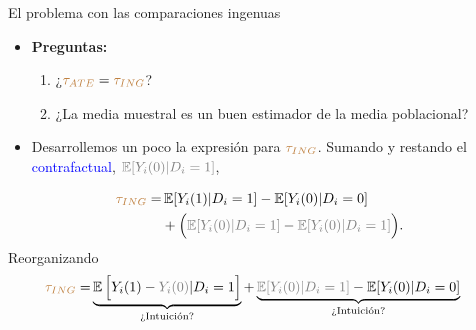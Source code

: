 \documentclass[10pt, xcolor=dvipsnames]{beamer}
\begin{document}
\begin{frame}{El problema con las comparaciones ingenuas}
\begin{itemize}	
    \item \textbf{Preguntas:} 
    \begin{enumerate}
        \item ¿$\textcolor{brown}{\tau_{ATE}}=\textcolor{brown}{\tau_{ING}}$?
        \item ¿La media muestral es un buen estimador de la media poblacional?%
    \end{enumerate}
    \vspace{1em}
    \item Desarrollemos un poco la expresión para $\textcolor{brown}{\tau_{ING}}$. Sumando y restando el \textcolor{blue}{contrafactual}, $\textcolor{gray}{\EX[Y_i(0)|D_i=1]}$,
\end{itemize}	
\begin{align*}
    \begin{split}
        \textcolor{brown}{\tau_{ING}} =& \EX[Y_i(1)|D_i=1] - \EX[Y_i(0)|D_i=0]  \\ &+ \Big(\textcolor{gray}{\EX[Y_i(0)|D_i=1]} - \textcolor{gray}{\EX[Y_i(0)|D_i=1]}\Big).
    \end{split}  
\end{align*}
Reorganizando
\begin{align}\label{EQ:CFT}
    \begin{split}
        \textcolor{brown}{\tau_{ING}} =& \underbrace{\EX\Big[Y_i(1)-\textcolor{gray}{Y_i(0)}|D_i=1\Big]}_{\text{¿Intuición?}} + \underbrace{\textcolor{gray}{\EX[Y_i(0)|D_i=1]} - \EX[Y_i(0)|D_i=0]}_{\text{¿Intuición?}}
    \end{split}
\end{align}
\end{frame}
\end{document}
